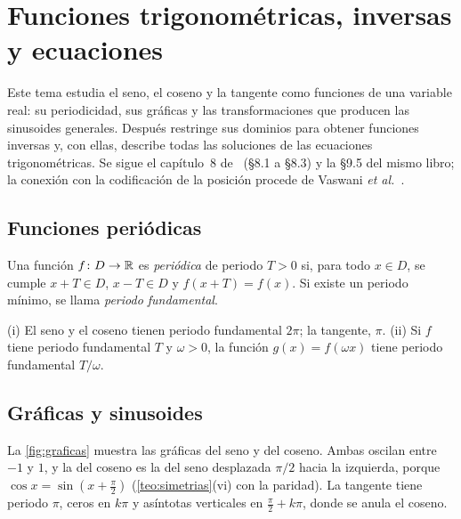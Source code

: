 \chapter{Funciones trigonométricas, inversas y ecuaciones}
\label{tema:4}

Este tema estudia el seno, el coseno y la tangente como funciones de una variable real: su periodicidad, sus gráficas y las transformaciones que producen las sinusoides generales. Después restringe sus dominios para obtener funciones inversas y, con ellas, describe todas las soluciones de las ecuaciones trigonométricas. Se sigue el capítulo~8 de~\cite{osat} (§8.1 a §8.3) y la §9.5 del mismo libro; la conexión con la codificación de la posición procede de Vaswani \emph{et al.}~\cite[§3.5]{vaswani}.

\section{Funciones periódicas}

\begin{definicion}
Una función $f\colon D\to\mathbb{R}$ es \emph{periódica} de periodo $T>0$ si, para todo $x\in D$, se cumple $x+T\in D$, $x-T\in D$ y $f(x+T)=f(x)$. Si existe un periodo mínimo, se llama \emph{periodo fundamental}.
\end{definicion}

\begin{proposicion}\label{prop:periodos}
(i) El seno y el coseno tienen periodo fundamental $2\pi$; la tangente, $\pi$. (ii) Si $f$ tiene periodo fundamental $T$ y $\omega>0$, la función $g(x)=f(\omega x)$ tiene periodo fundamental $T/\omega$.
\end{proposicion}

\section{Gráficas y sinusoides}

La \cref{fig:graficas} muestra las gráficas del seno y del coseno. Ambas oscilan entre $-1$ y $1$, y la del coseno es la del seno desplazada $\pi/2$ hacia la izquierda, porque $\cos x=\sin(x+\frac{\pi}{2})$ (\cref{teo:simetrias}(vi) con la paridad). La tangente tiene periodo $\pi$, ceros en $k\pi$ y asíntotas verticales en $\frac{\pi}{2}+k\pi$, donde se anula el coseno.

